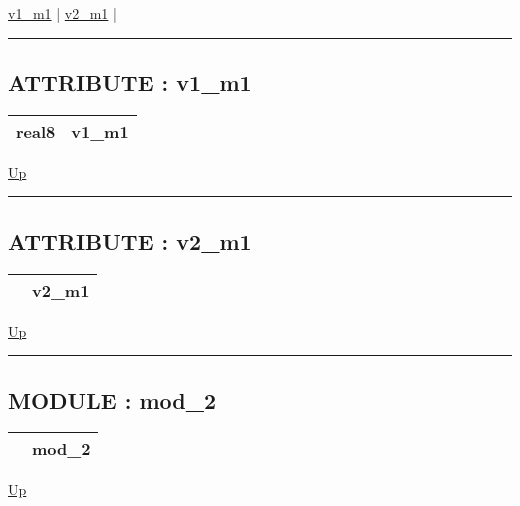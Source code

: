 \hyperlink{ecldoc:example_2.mod_1.v1_m1}{v1\_m1}  |
\hyperlink{ecldoc:example_2.mod_1.v2_m1}{v2\_m1}  |

\rule{\textwidth}{0.4pt}

\subsection*{ATTRIBUTE : v1\_m1}
\hypertarget{ecldoc:example_2.mod_1.v1_m1}{}

{\renewcommand{\arraystretch}{1.5}
\begin{tabularx}{\textwidth}{|>{\raggedright\arraybackslash}l|X|}
\hline
\hspace{0pt}real8 & v1\_m1 \\
\hline
\end{tabularx}
}

\hyperlink{ecldoc:example_2.mod_1}{Up}

\par


\rule{\textwidth}{0.4pt}
\subsection*{ATTRIBUTE : v2\_m1}
\hypertarget{ecldoc:example_2.mod_1.v2_m1}{}

{\renewcommand{\arraystretch}{1.5}
\begin{tabularx}{\textwidth}{|>{\raggedright\arraybackslash}l|X|}
\hline
\hspace{0pt} & v2\_m1 \\
\hline
\end{tabularx}
}

\hyperlink{ecldoc:example_2.mod_1}{Up}

\par


\rule{\textwidth}{0.4pt}


\subsection*{MODULE : mod\_2}
\hypertarget{ecldoc:example_2.mod_2}{}

{\renewcommand{\arraystretch}{1.5}
\begin{tabularx}{\textwidth}{|>{\raggedright\arraybackslash}l|X|}
\hline
\hspace{0pt} & mod\_2 \\
\hline
\end{tabularx}
}

\hyperlink{ecldoc:example_2}{Up}


